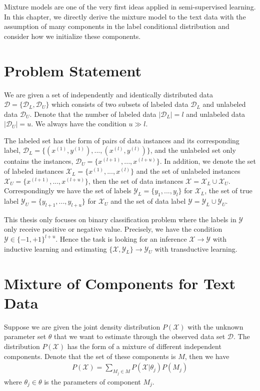 Mixture models are one of the very first ideas applied in semi-supervised learning.  In this chapter, we directly derive the mixture model to the text data with the assumption of many components in the label conditional distribution and consider how we initialize these components.

\section{Problem Statement}
We are given a set of independently and identically distributed data $\mathcal{D} = \{\mathcal{D}_L, \mathcal{D}_U\}$ which consists of two subsets of labeled data $\mathcal{D}_L$ and unlabeled data $\mathcal{D}_U$. Denote that the number of labeled data $|\mathcal{D}_L| = l$ and unlabeled data $|\mathcal{D}_U| = u$. We always have the condition $u \gg l$. 

The labeled set has the form of pairs of data instances and its corresponding label, $\mathcal{D}_L = \{ (x^{(1)}, y^{(1)}), ..., (x^{(l)}, y^{(l)}) \}$, and the unlabeled set only contains the instances, $\mathcal{D}_U = \{ x^{(l+1)}, ..., x^{(l+u)} \}$. In addition, we denote the set of labeled instances $\mathcal{X}_L = \{ x^{(1)}, ..., x^{(l)} \}$ and the set of unlabeled instances $\mathcal{X}_U = \{ x^{(l+1)}, ..., x^{(l+u)} \}$, then the set of data instances $\mathcal{X} = \mathcal{X}_L \cup \mathcal{X}_U $. Correspondingly we have the set of labels $\mathcal{Y}_L = \{ y_1, ..., y_l \}$ for $\mathcal{X}_L$, the set of true label $\mathcal{Y}_U = \{ y_{l+1}, ..., y_{l+u} \}$ for $\mathcal{X}_U$ and the set of data label $\mathcal{Y} = \mathcal{Y}_L \cup \mathcal{Y}_U$.

This thesis only focuses on binary classification problem where the labels in $\mathcal{Y}$ only receive positive or negative value. Precisely, we have the condition $\mathcal{Y} \in \{-1,+1\}^{l+u}$. Hence the task is looking for an inference $\mathcal{X} \rightarrow \mathcal{Y}$ with inductive learning and estimating $\{ \mathcal{X}, \mathcal{Y}_L \} \rightarrow \mathcal{Y}_U$ with transductive learning.

\section{Mixture of Components for Text Data}
Suppose we are given the joint density distribution $P(\mathcal{X})$ with the unknown parameter set $\theta$ that we want to estimate through the observed data set $\mathcal{D}$. The distribution $P(\mathcal{X})$ has the form of a mixture of different independent components. Denote that the set of these components is $M$, then we have
\begin{align}
	\label{equal2: general many-to-one assumption}
	P(\mathcal{X}) = \sum_{M_j \in M}{P(\mathcal{X} | \theta_j) P(M_j)}
\end{align}
where $\theta_j \in \theta$ is the parameters of component $M_j$.


